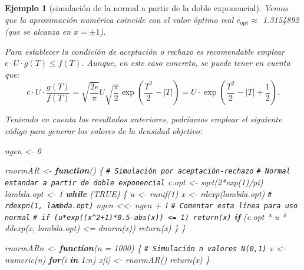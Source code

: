 \documentclass[
]{book}
\newenvironment{Shaded}{\begin{snugshade}}{\end{snugshade}}
\newcommand{\AttributeTok}[1]{\textcolor[rgb]{0.77,0.63,0.00}{#1}}
\newcommand{\CommentTok}[1]{\textcolor[rgb]{0.56,0.35,0.01}{\textit{#1}}}
\newcommand{\ConstantTok}[1]{\textcolor[rgb]{0.00,0.00,0.00}{#1}}
\newcommand{\ControlFlowTok}[1]{\textcolor[rgb]{0.13,0.29,0.53}{\textbf{#1}}}
\newcommand{\DecValTok}[1]{\textcolor[rgb]{0.00,0.00,0.81}{#1}}
\newcommand{\FunctionTok}[1]{\textcolor[rgb]{0.00,0.00,0.00}{#1}}
\newcommand{\NormalTok}[1]{#1}
\newcommand{\OtherTok}[1]{\textcolor[rgb]{0.56,0.35,0.01}{#1}}
\newcommand{\SpecialCharTok}[1]{\textcolor[rgb]{0.00,0.00,0.00}{#1}}
\theoremstyle{break}
\newtheorem{example}{Ejemplo}[chapter]
\theoremstyle{nonumberplain}
\renewcommand{\CommentTok}[1]{\textcolor[rgb]{0.41,0.41,0.41}{\texttt{#1}}}
\begin{document}
\begin{example}[simulación de la normal a partir de la doble exponencial]
Vemos que la aproximación numérica coincide con el valor óptimo real \(c_{\text{opt}} \approx\) 1.3154892 (que se alcanza en \(x = \pm 1\)).

Para establecer la condición de aceptación o rechazo es recomendable emplear
\(c\cdot U\cdot g\left( T\right) \leq f\left( T\right)\).
Aunque, en este caso concreto, se puede tener en cuenta que:
\[c\cdot U\cdot\frac{g\left( T\right)  }{f\left( T\right)  }=\sqrt{\frac
{2e}{\pi}}U\sqrt{\frac{\pi}{2}}\exp\left( \frac{T^{2}}{2}-\left\vert
T\right\vert \right)  =U\cdot\exp\left( \frac{T^{2}}{2}-\left\vert
T\right\vert +\frac{1}{2}\right).\]

Teniendo en cuenta los resultados anteriores, podríamos emplear el siguiente código para generar los valores de la densidad objetivo:

\begin{Shaded}
\begin{Highlighting}[]
\NormalTok{ngen }\OtherTok{\textless{}{-}} \DecValTok{0}

\NormalTok{rnormAR }\OtherTok{\textless{}{-}} \ControlFlowTok{function}\NormalTok{() \{}
\CommentTok{\# Simulación por aceptación{-}rechazo}
\CommentTok{\# Normal estandar a partir de doble exponencial}
\NormalTok{  c.opt }\OtherTok{\textless{}{-}} \FunctionTok{sqrt}\NormalTok{(}\DecValTok{2}\SpecialCharTok{*}\FunctionTok{exp}\NormalTok{(}\DecValTok{1}\NormalTok{)}\SpecialCharTok{/}\NormalTok{pi)}
\NormalTok{  lambda.opt }\OtherTok{\textless{}{-}} \DecValTok{1}
  \ControlFlowTok{while}\NormalTok{ (}\ConstantTok{TRUE}\NormalTok{) \{}
\NormalTok{    u }\OtherTok{\textless{}{-}} \FunctionTok{runif}\NormalTok{(}\DecValTok{1}\NormalTok{)}
\NormalTok{    x }\OtherTok{\textless{}{-}} \FunctionTok{rdexp}\NormalTok{(lambda.opt) }\CommentTok{\# rdexpn(1, lambda.opt)}
\NormalTok{    ngen }\OtherTok{\textless{}\textless{}{-}}\NormalTok{ ngen }\SpecialCharTok{+} \DecValTok{1} \CommentTok{\# Comentar esta línea para uso normal}
    \CommentTok{\# if (u*exp((x\^{}2+1)*0.5{-}abs(x)) \textless{}= 1) return(x)}
    \ControlFlowTok{if}\NormalTok{ (c.opt }\SpecialCharTok{*}\NormalTok{ u }\SpecialCharTok{*} \FunctionTok{ddexp}\NormalTok{(x, lambda.opt) }\SpecialCharTok{\textless{}=} \FunctionTok{dnorm}\NormalTok{(x)) }\FunctionTok{return}\NormalTok{(x)}
\NormalTok{  \}}
\NormalTok{\}}

\NormalTok{rnormARn }\OtherTok{\textless{}{-}} \ControlFlowTok{function}\NormalTok{(}\AttributeTok{n =} \DecValTok{1000}\NormalTok{) \{}
\CommentTok{\# Simulación n valores N(0,1)}
\NormalTok{    x }\OtherTok{\textless{}{-}} \FunctionTok{numeric}\NormalTok{(n)}
    \ControlFlowTok{for}\NormalTok{(i }\ControlFlowTok{in} \DecValTok{1}\SpecialCharTok{:}\NormalTok{n) x[i] }\OtherTok{\textless{}{-}} \FunctionTok{rnormAR}\NormalTok{()}
    \FunctionTok{return}\NormalTok{(x)}
\NormalTok{\}}
\end{Highlighting}
\end{Shaded}


\end{example}
\end{document}
